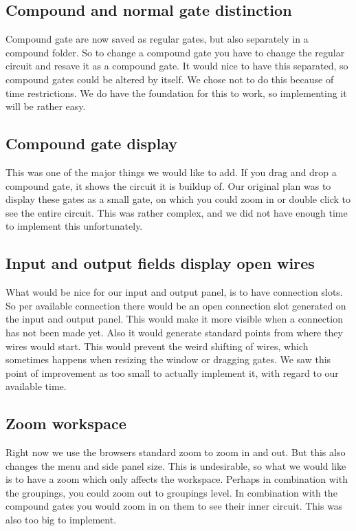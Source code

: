 \subsection{Compound and normal gate distinction}
Compound gate are now saved as regular gates, but also separately in a compound folder. So to change a compound gate you have to change the regular circuit and resave it as a compound gate. It would nice to have this separated, so compound gates could be altered by itself.
We chose not to do this because of time restrictions. We do have the foundation for this to work, so implementing it will be rather easy.

\subsection{Compound gate display}
This was one of the major things we would like to add. If you drag and drop a compound gate, it shows the circuit it is buildup of. Our original plan was to display these gates as a small gate, on which you could zoom in or double click to see the entire circuit. This was rather complex, and we did not have enough time to implement this unfortunately.

\subsection{Input and output fields display open wires}
What would be nice for our input and output panel, is to have connection slots. So per available connection there would be an open connection slot generated on the input and output panel. This would make it more visible when a connection has not been made yet. Also it would generate standard points from where they wires would start. This would prevent the weird shifting of wires, which sometimes happens when resizing the window or dragging gates.
We saw this point of improvement as too small to actually implement it, with regard to our available time.

\subsection{Zoom workspace}
Right now we use the browsers standard zoom to zoom in and out. But this also changes the menu and side panel size. This is undesirable, so what we would like is to have a zoom which only affects the workspace. Perhaps in combination with the groupings, you could zoom out to groupings level. In combination with the compound gates you would zoom in on them to see their inner circuit. This was also too big to implement.

